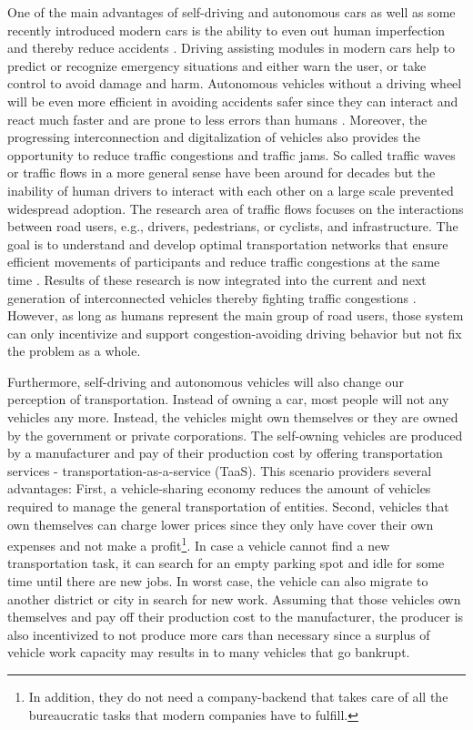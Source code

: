\documentclass{llncs}
\begin{document}
{		One of the main advantages of self-driving and autonomous cars as well as some recently introduced modern cars is the ability to even out human imperfection and thereby reduce accidents \cite{bibid}. Driving assisting modules in modern cars help to predict or recognize emergency situations and either warn the user, or take control to avoid damage and harm. Autonomous vehicles without a driving wheel will be even more efficient in avoiding accidents safer since they can interact and react much faster and are prone to less errors than humans \cite{bibid}. Moreover, the progressing interconnection and digitalization of vehicles also provides the opportunity to reduce traffic congestions and traffic jams. So called traffic waves or traffic flows in a more general sense have been around for decades but the inability of human drivers to interact with each other on a large scale prevented widespread adoption. The research area of traffic flows focuses on the interactions between road users, e.g., drivers, pedestrians, or cyclists, and infrastructure. The goal is to understand and develop optimal transportation networks that ensure efficient movements of participants and reduce traffic congestions at the same time \cite{beaty1998traffic}\cite{whitham1955kinematic}. Results of these research is now integrated into the current and next generation of interconnected vehicles thereby fighting traffic congestions \cite{daganzo2002behavioral}\cite{kesting2008adaptive}\cite{wang2001application}. However, as long as humans represent the main group of road users, those system can only incentivize and support congestion-avoiding driving behavior but not fix the problem as a whole.
		
		Furthermore, self-driving and autonomous vehicles will also change our perception of transportation. Instead of owning a car, most people will not any vehicles any more. Instead, the vehicles might own themselves or they are owned by the government or private corporations. The self-owning vehicles are produced by a manufacturer and pay of their production cost by offering transportation services - transportation-as-a-service (TaaS). This scenario providers several advantages: First, a vehicle-sharing economy reduces the amount of vehicles required to manage the general transportation of entities. Second, vehicles that own themselves can charge lower prices since they only have cover their own expenses and not make a profit\footnote{In addition, they do not need a company-backend that takes care of all the bureaucratic tasks that modern companies have to fulfill.}. In case a vehicle cannot find a new transportation task, it can search for an empty parking spot and idle for some time until there are new jobs. In worst case, the vehicle can also migrate to another district or city in search for new work. Assuming that those vehicles own themselves and pay off their production cost to the manufacturer, the producer is also incentivized to not produce more cars than necessary since a surplus of vehicle work capacity may results in to many vehicles that go bankrupt.
		
}
\end{document}
